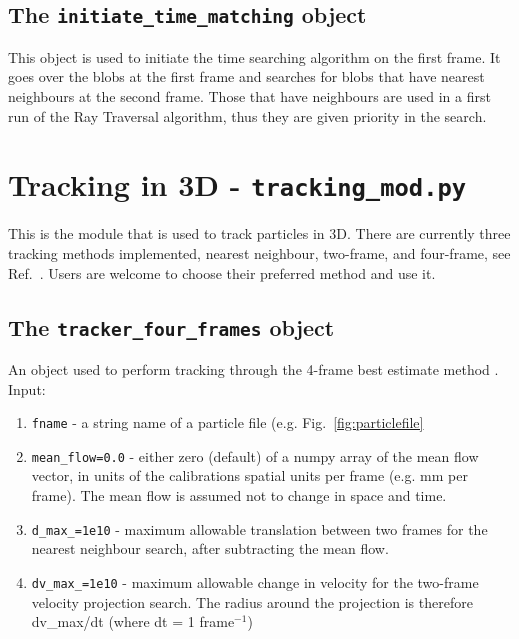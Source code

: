 \documentclass[10pt,a4paper]{article}
\begin{document}
\subsection{The \texttt{initiate\_time\_matching} object}

This object is used to initiate the time searching algorithm on the first frame. It goes over the blobs at the first frame and searches for blobs that have nearest neighbours at the second frame. Those that have neighbours are used in a first run of the Ray Traversal algorithm, thus they are given priority in the search.













\section{Tracking in 3D - \texttt{tracking\_mod.py}}

This is the module that is used to track particles in 3D. There are currently three tracking methods implemented, nearest neighbour, two-frame, and four-frame, see Ref.~\cite{Ouellette2006}. Users are welcome to choose their preferred method and use it.



\subsection{The \texttt{tracker\_four\_frames} object}\label{sec:four_frames}

An object used to perform tracking through the 4-frame best estimate method \cite{Ouellette2006}. Input:
%
\begin{enumerate}
	\item \texttt{fname} - a string name of a particle file (e.g. Fig.~\ref{fig:particlefile}
	\item \texttt{mean\_flow=0.0} - either zero (default) of a numpy array of the mean flow vector, in units of the calibrations spatial units per frame (e.g. mm per frame). The mean flow is assumed not to change in space and time.
	\item \texttt{d\_max\_=1e10} - maximum allowable translation between two frames for the nearest neighbour search, after subtracting the mean flow. 
	\item \texttt{dv\_max\_=1e10} - maximum allowable change in velocity for the two-frame velocity projection search. The radius around the projection is therefore dv\_max/dt (where dt = 1 frame$^{-1}$)
\end{enumerate}
\end{document}
